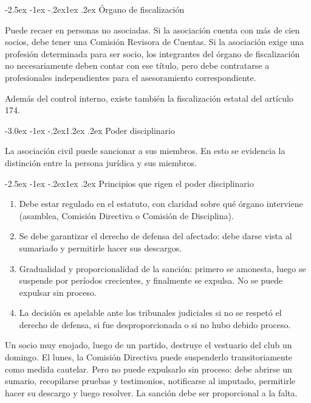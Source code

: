 \documentclass[12pt,oneside]{book}
\makeatletter
\renewcommand\section{\@startsection{section}{1}{\z@}%
  {-3.0ex \@plus -1ex \@minus -.2ex}{1.2ex \@plus .2ex}%
  {\normalfont\large\bfseries\color{acento}}}
\renewcommand\subsection{\@startsection{subsection}{2}{\z@}%
  {-2.5ex \@plus -1ex \@minus -.2ex}{1ex \@plus .2ex}%
  {\normalfont\normalsize\bfseries}}
\makeatother
\begin{document}
\subsection{Órgano de fiscalización}

Puede recaer en personas no asociadas. Si la asociación cuenta con más de cien socios, debe tener una Comisión Revisora de Cuentas. Si la asociación exige una profesión determinada para ser socio, los integrantes del órgano de fiscalización no necesariamente deben contar con ese título, pero debe contratarse a profesionales independientes para el asesoramiento correspondiente.

Además del control interno, existe también la fiscalización estatal del artículo 174.

\section{Poder disciplinario}

La asociación civil puede sancionar a sus miembros. En esto se evidencia la distinción entre la persona jurídica y sus miembros.

\subsection{Principios que rigen el poder disciplinario}

\begin{enumerate}
    \item Debe estar regulado en el estatuto, con claridad sobre qué órgano interviene (asamblea, Comisión Directiva o Comisión de Disciplina).
    \item Se debe garantizar el derecho de defensa del afectado: debe darse vista al sumariado y permitirle hacer sus descargos.
    \item Gradualidad y proporcionalidad de la sanción: primero se amonesta, luego se suspende por períodos crecientes, y finalmente se expulsa. No se puede expulsar sin proceso.
    \item La decisión es apelable ante los tribunales judiciales si no se respetó el derecho de defensa, si fue desproporcionada o si no hubo debido proceso.
\end{enumerate}

\begin{ejemplo}
Un socio muy enojado, luego de un partido, destruye el vestuario del club un domingo. El lunes, la Comisión Directiva puede suspenderlo transitoriamente como medida cautelar. Pero no puede expulsarlo sin proceso: debe abrirse un sumario, recopilarse pruebas y testimonios, notificarse al imputado, permitirle hacer su descargo y luego resolver. La sanción debe ser proporcional a la falta.
\end{ejemplo}
\end{document}
